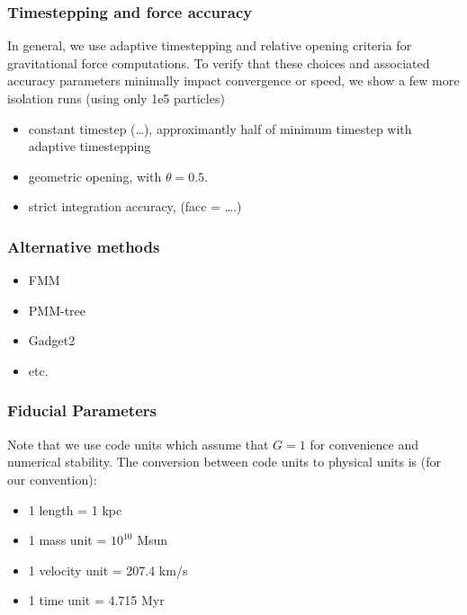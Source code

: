 \subsubsection{Timestepping and force
accuracy}\label{timestepping-and-force-accuracy}

In general, we use adaptive timestepping and relative opening criteria
for gravitational force computations. To verify that these choices and
associated accuracy parameters minimally impact convergence or speed, we
show a few more isolation runs (using only 1e5 particles)

\begin{itemize}
\tightlist
\item
  constant timestep (\ldots), approximantly half of minimum timestep
  with adaptive timestepping
\item
  geometric opening, with \(\theta = 0.5\).
\item
  strict integration accuracy, (facc = \ldots.)
\end{itemize}

\subsubsection{Alternative methods}\label{alternative-methods}

\begin{itemize}
\tightlist
\item
  FMM
\item
  PMM-tree
\item
  Gadget2
\item
  etc.
\end{itemize}

\subsubsection{Fiducial Parameters}\label{fiducial-parameters}

Note that we use code units which assume that \(G=1\) for convenience
and numerical stability. The conversion between code units to physical
units is (for our convention):

\begin{itemize}
\tightlist
\item
  1 length = 1 kpc
\item
  1 mass unit = \(10^{10}\) Msun
\item
  1 velocity unit = 207.4 km/s
\item
  1 time unit = 4.715 Myr
\end{itemize}


